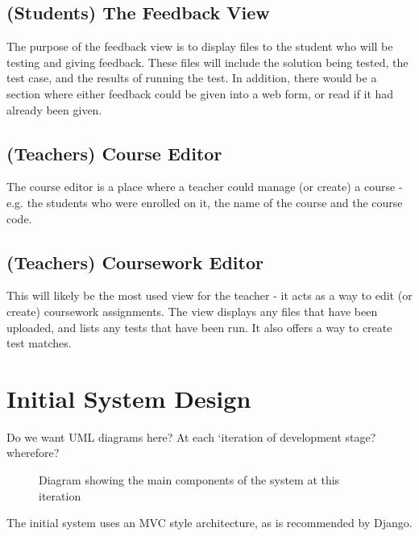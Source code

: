 \documentclass[a4paper,11pt]{report}
\begin{document}
\subsection{(Students) The Feedback View}
The purpose of the feedback view is to display files to the student who will be testing and giving feedback. These files will include the solution being tested, the test case, and the results of running the test. In addition, there would be a section where either feedback could be given into a web form, or read if it had already been given.
\subsection{(Teachers) Course Editor}
The course editor is a place where a teacher could manage (or create) a course - e.g. the students who were enrolled on it, the name of the course and the course code.
\subsection{(Teachers) Coursework Editor}
This will likely be the most used view for the teacher - it acts as a way to edit (or create) coursework assignments. The view displays any files that have been uploaded, and lists any tests that have been run. It also offers a way to create test matches.

\section{Initial System Design}
Do we want UML diagrams here? At each `iteration of development stage? wherefore?
\begin{figure}[ht]
\centering
{}
\caption{Diagram showing the main components of the system at this iteration}
\label{fig:i1sd}
\end{figure}
The initial system uses an MVC style architecture, as is recommended by Django.
\end{document}

